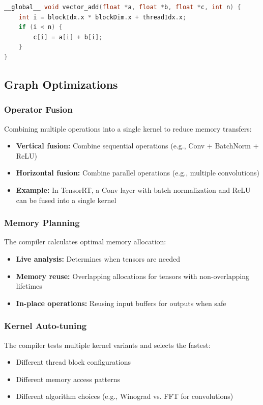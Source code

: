 \documentclass[11pt]{article}
\begin{document}
\lstset{style=cppstyle}
\begin{lstlisting}[caption=Simplified CUDA Kernel, language=C++]
__global__ void vector_add(float *a, float *b, float *c, int n) {
    int i = blockIdx.x * blockDim.x + threadIdx.x;
    if (i < n) {
        c[i] = a[i] + b[i];
    }
}
\end{lstlisting}

\subsection{Graph Optimizations}

\subsubsection{Operator Fusion}
Combining multiple operations into a single kernel to reduce memory transfers:

\begin{itemize}
    \item \textbf{Vertical fusion:} Combine sequential operations (e.g., Conv + BatchNorm + ReLU)
    \item \textbf{Horizontal fusion:} Combine parallel operations (e.g., multiple convolutions)
    \item \textbf{Example:} In TensorRT, a Conv layer with batch normalization and ReLU can be fused into a single kernel
\end{itemize}

\subsubsection{Memory Planning}
The compiler calculates optimal memory allocation:
\begin{itemize}
    \item \textbf{Live analysis:} Determines when tensors are needed
    \item \textbf{Memory reuse:} Overlapping allocations for tensors with non-overlapping lifetimes
    \item \textbf{In-place operations:} Reusing input buffers for outputs when safe
\end{itemize}

\subsubsection{Kernel Auto-tuning}
The compiler tests multiple kernel variants and selects the fastest:
\begin{itemize}
    \item Different thread block configurations
    \item Different memory access patterns
    \item Different algorithm choices (e.g., Winograd vs. FFT for convolutions)
\end{itemize}
\end{document}
